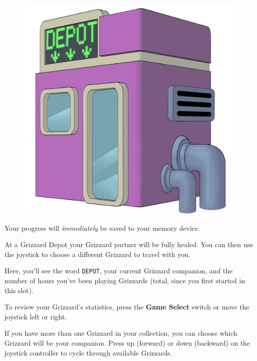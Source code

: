 \documentclass[10pt,twocolumn,openany,article]{memoir}
\begin{document}
\begin{figure}[b]
  \begin{center}
    \includegraphics[width=2\columnwidth]{../Manual/GrizzardDepot.png}
  \end{center}
\end{figure}

\ifdefined\NOSAVE\else
Your progress will \emph{immediately} be saved to your memory device.
\fi

At  a  Grizzard  Depot  your  Grizzard partner  will  be  fully  healed.
\ifdefined\NOSAVE\else You can then use the joystick to choose a different
Grizzard to travel with you. \fi

Here,  you'll  see  the   word  \texttt{DEPOT},  your  current  Grizzard
companion, and the number of hours you've been playing Grizzards (total,
since you first started in this slot).

To   review  your   Grizzard's   statistics,   press  the   \textbf{Game
  Select} switch or move the joystick left or right.

\ifdefined\NOSAVE\else
If you  have more than one  Grizzard in your collection,  you can choose
which  Grizzard will  be  your  companion. Press  up  (forward) or  down
(backward)  on  the  joystick  controller  to  cycle  through  available
Grizzards.
\fi
\end{document}

